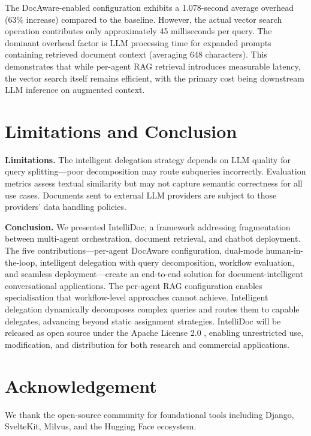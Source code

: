\documentclass[11pt]{article}
\begin{document}
The DocAware-enabled configuration exhibits a 1.078-second average overhead (63\% increase) compared to the baseline. However, the actual vector search operation contributes only approximately 45 milliseconds per query. The dominant overhead factor is LLM processing time for expanded prompts containing retrieved document context (averaging 648 characters). This demonstrates that while per-agent RAG retrieval introduces measurable latency, the vector search itself remains efficient, with the primary cost being downstream LLM inference on augmented context.


\section{Limitations and Conclusion}
\label{sec:conclusion}

\textbf{Limitations.} The intelligent delegation strategy depends on LLM quality for query splitting—poor decomposition may route subqueries incorrectly. Evaluation metrics assess textual similarity but may not capture semantic correctness for all use cases. Documents sent to external LLM providers are subject to those providers' data handling policies.

\textbf{Conclusion.} We presented IntelliDoc, a framework addressing fragmentation between multi-agent orchestration, document retrieval, and chatbot deployment. The five contributions---per-agent DocAware configuration, dual-mode human-in-the-loop, intelligent delegation with query decomposition, workflow evaluation, and seamless deployment---create an end-to-end solution for document-intelligent conversational applications. The per-agent RAG configuration enables specialisation that workflow-level approaches cannot achieve. Intelligent delegation dynamically decomposes complex queries and routes them to capable delegates, advancing beyond static assignment strategies. IntelliDoc will be released as open source under the Apache License 2.0 \citep{apache2license}, enabling unrestricted use, modification, and distribution for both research and commercial applications.




\section*{Acknowledgement}

We thank the open-source community for foundational tools including Django, SvelteKit, Milvus, and the Hugging Face ecosystem.
\end{document}
